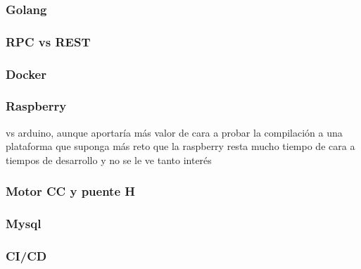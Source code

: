 \subsubsection{Golang}

\subsubsection{RPC vs REST}

\subsubsection{Docker}

\subsubsection{Raspberry}
vs arduino, aunque aportaría más valor de cara a probar la compilación a una plataforma que suponga más reto que la raspberry resta mucho tiempo de cara a tiempos de desarrollo y no se le ve tanto interés
\subsubsection{Motor CC y puente H}
\subsubsection{Mysql}
\subsubsection{CI/CD}